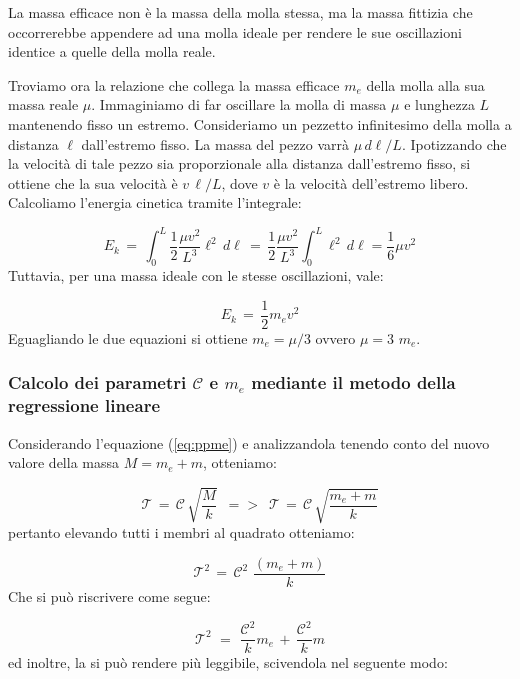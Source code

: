 La massa efficace non è la massa della molla stessa, ma la massa fittizia che occorrerebbe
appendere ad una molla ideale per rendere le sue oscillazioni identice a quelle della molla reale.

Troviamo ora la relazione che collega la massa efficace $m_e$ della molla alla sua massa reale $\mu$.
Immaginiamo di far oscillare la molla di massa $\mu$ e lunghezza $L$ mantenendo fisso un estremo.
Consideriamo un pezzetto infinitesimo della molla a distanza $\ell$ dall'estremo fisso. La massa del pezzo
varrà $\mu \, d\ell / L$. Ipotizzando che la velocità di tale pezzo sia proporzionale alla distanza dall'estremo
fisso, si ottiene che la sua velocità è $v \, \ell / L$, dove $v$ è la velocità dell'estremo libero.
Calcoliamo l'energia cinetica tramite l'integrale:

\begin{equation*}
    E_k \, = \, \int_0^L \frac{1}{2} \frac{\mu v^2}{L^3} \ell^2 \, d\ell \, = \,
    \frac{1}{2} \frac{\mu v^2}{L^3} \int_0^L \ell^2 \, d\ell = \frac{1}{6} \mu v^2
\end{equation*}
%
Tuttavia, per una massa ideale con le stesse oscillazioni, vale:

\begin{equation*}
    E_k \, = \, \frac{1}{2} m_e v^2
\end{equation*}
%
Eguagliando le due equazioni si ottiene $m_e = \mu/3$ ovvero $\mu = 3\,\,m_e$. 

\subsubsection{Calcolo dei parametri $\mathcal{C}$ e $m_e$ mediante il metodo della regressione lineare}
Considerando l'equazione (\ref{eq:ppme}) e analizzandola tenendo conto del nuovo valore della massa $M = m_e + m$, otteniamo:

\begin{equation*}
	\mathcal{T} \,=\, \mathcal{C} \, \sqrt{\frac{M}{k}}	\,\,\,=>\,\,\, \mathcal{T} \,=\, \mathcal{C} \, \sqrt{\frac{m_e + m}{k}}
\end{equation*}
%
pertanto elevando tutti i membri al quadrato otteniamo:

\begin{equation*}
	\mathcal{T}^2 \,=\, \mathcal{C}^2 \,\, \frac{(m_e + m)}{k}
\end{equation*}
%
Che si può riscrivere come segue:

\begin{equation}
	\mathcal{T}^2 \,\,=\,\, \frac{\mathcal{C}^2}{k} m_e \,+\, \frac{\mathcal{C}^2}{k} m
	\label{eq:mCspezzati}
\end{equation}
%
ed inoltre, la si può rendere più leggibile, scivendola nel seguente modo:

